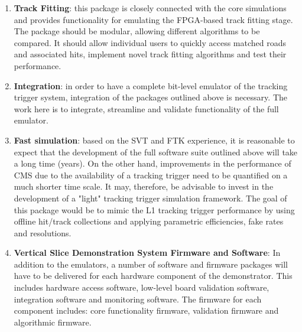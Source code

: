 \begin{enumerate}
\item {\bf Track Fitting}: this package is closely connected with the core simulations and provides functionality for emulating the FPGA-based track fitting stage. The package should be modular, allowing different algorithms to be compared. It should allow individual users to quickly access matched roads and associated hits, implement novel track fitting algorithms and test their performance.

\item {\bf Integration}: in order to have a complete bit-level emulator of the tracking trigger system, integration of the packages outlined above is necessary. The work here is to integrate, streamline and validate functionality of the full emulator.


\item {\bf Fast simulation}: based on the SVT and FTK experience, it is reasonable to expect that the development of the full software suite outlined above will take a long time (years). On the other hand, improvements in the performance of CMS due to the availability of a tracking trigger need to be quantified on a much shorter time scale. It may, therefore, be advisable to invest in the development of a "light" tracking trigger simulation framework. The goal of this package would be to mimic the L1 tracking trigger performance by using offline hit/track collections and applying parametric efficiencies, fake rates and resolutions.

\item {\bf Vertical Slice Demonstration System Firmware and Software}: In addition to the emulators, a number of software and firmware packages will have to be delivered for each hardware component of the demonstrator. This includes hardware access software, low-level board validation software, integration software and monitoring software. The firmware for each component includes: core functionality firmware, validation firmware and algorithmic firmware.

\end{enumerate}


\clearpage
